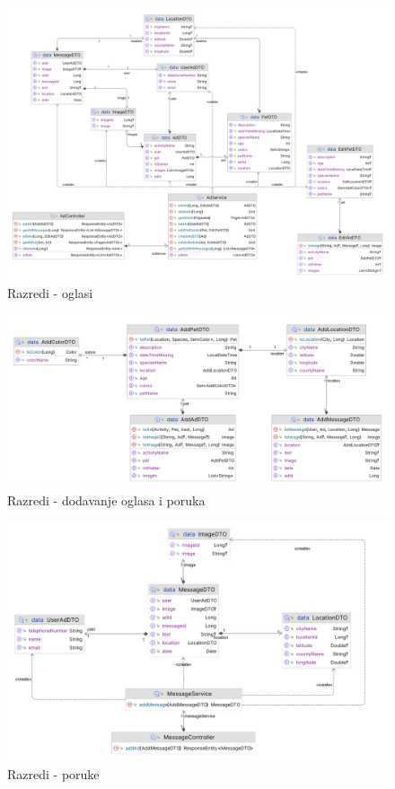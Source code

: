 			\begin{figure}[H]
				\includegraphics[scale=0.225]{slike/class_ad.PNG} 
				\centering
				\caption{Razredi - oglasi}
				\label{class_ad}
			\end{figure}
			
			\begin{figure}[H]
				\includegraphics[scale=0.25]{slike/class_add_ad_message.PNG} 
				\centering
				\caption{Razredi - dodavanje oglasa i poruka}
				\label{class_add_ad_message}
			\end{figure}
			
			\begin{figure}[H]
				\includegraphics[scale=0.25]{slike/class_message.PNG} 
				\centering
				\caption{Razredi - poruke}
				\label{class_message}
			\end{figure}
			
